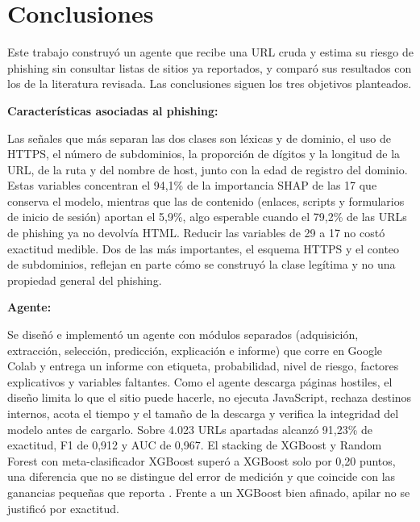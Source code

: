 \section{Conclusiones}

Este trabajo construyó un agente que recibe una URL cruda y estima su riesgo de phishing sin consultar listas de sitios ya reportados, y comparó sus resultados con los de la literatura revisada. Las conclusiones siguen los tres objetivos planteados. \newline

\textbf{Características asociadas al phishing:} \par 
Las señales que más separan las dos clases son léxicas y de dominio, el uso de HTTPS, el número de subdominios, la proporción de dígitos y la longitud de la URL, de la ruta y del nombre de host, junto con la edad de registro del dominio. Estas variables concentran el 94,1\% de la importancia SHAP de las 17 que conserva el modelo, mientras que las de contenido (enlaces, scripts y formularios de inicio de sesión) aportan el 5,9\%, algo esperable cuando el 79,2\% de las URLs de phishing ya no devolvía HTML. Reducir las variables de 29 a 17 no costó exactitud medible. Dos de las más importantes, el esquema HTTPS y el conteo de subdominios, reflejan en parte cómo se construyó la clase legítima y no una propiedad general del phishing. \newline

\textbf{Agente:} \par 
Se diseñó e implementó un agente con módulos separados (adquisición, extracción, selección, predicción, explicación e informe) que corre en Google Colab y entrega un informe con etiqueta, probabilidad, nivel de riesgo, factores explicativos y variables faltantes. Como el agente descarga páginas hostiles, el diseño limita lo que el sitio puede hacerle, no ejecuta JavaScript, rechaza destinos internos, acota el tiempo y el tamaño de la descarga y verifica la integridad del modelo antes de cargarlo. Sobre 4.023 URLs apartadas alcanzó 91,23\% de exactitud, F1 de 0,912 y AUC de 0,967. El stacking de XGBoost y Random Forest con meta-clasificador XGBoost superó a XGBoost solo por 0,20 puntos, una diferencia que no se distingue del error de medición y que coincide con las ganancias pequeñas que reporta \cite{kalabarige2023boosting}. Frente a un XGBoost bien afinado, apilar no se justificó por exactitud. \newline

